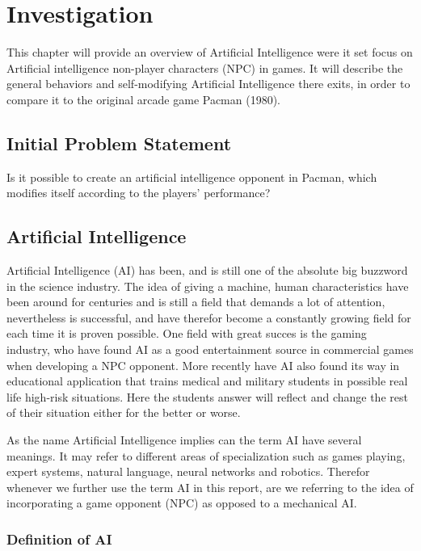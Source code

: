 \section{Investigation} \label{sec:preanalysus}
This chapter will provide an overview of Artificial Intelligence were it set focus on Artificial intelligence non-player characters (NPC) in games. It will describe the general behaviors and self-modifying Artificial Intelligence there exits, in order to compare it to the original arcade game Pacman (1980). 


\subsection{Initial Problem Statement} \label{sec:initialproblemstatement}
Is it possible to create an artificial intelligence opponent in Pacman, which modifies itself according to the players' performance?


\subsection{Artificial Intelligence} \label{sec:ai}
Artificial Intelligence (AI) has been, and is still one of the absolute big buzzword in the science industry. 
The idea of giving a machine, human characteristics have been around for centuries and is still a field that demands a lot of attention, nevertheless is successful, and have therefor become a constantly growing field for each time it is proven possible.
One field with great succes is the gaming industry, who have found AI as a good entertainment source in commercial games when developing a NPC opponent. More recently have AI also found its way in educational application that trains medical and military students in possible real life high-risk situations. Here the students answer will reflect and change the rest of their situation either for the better or worse.   

As the name Artificial Intelligence implies can the term AI have several meanings. It may refer to different areas of specialization such as games playing, expert systems, natural language, neural networks and robotics.  
Therefor whenever we further use the term AI in this report, are we referring to the idea of incorporating a game opponent (NPC) as opposed to a mechanical AI. 



\subsubsection{Definition of AI}

